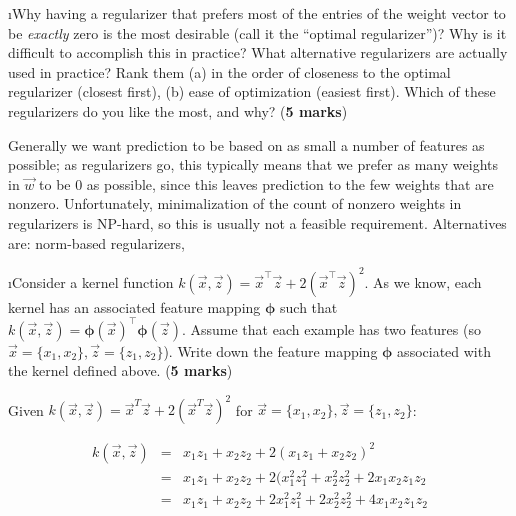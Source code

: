 \documentclass[fleqn]{article}
\begin{document}
\i Why having a regularizer that prefers most of the entries of the weight
vector to be \textit{exactly} zero is the most desirable (call it the ``optimal
regularizer'')? Why is it difficult to accomplish this in practice? What 
alternative regularizers are actually used in practice? Rank them (a) in the order
of closeness to the optimal regularizer (closest first), (b) ease of optimization
(easiest first). Which of these regularizers do you like the most, and why?
(\textbf{5 marks})

\begin{solution}
Generally we want prediction to be based on as small a number of features as possible; as regularizers go, this typically means that we prefer as many weights in $\vec{w}$ to be $0$ as possible, since this leaves prediction to the few weights that are nonzero. Unfortunately, minimalization of the count of nonzero weights in regularizers is NP-hard, so this is usually not a feasible requirement. Alternatives are: norm-based regularizers,
\end{solution}

\i Consider a kernel function $k(\vec{x},\vec{z}) = \vec{x}^\top \vec{z}
+ 2(\vec{x}^\top \vec{z})^2$. As we know, each kernel has an associated 
feature mapping $\boldsymbol{\phi}$ such that $k(\vec{x},\vec{z}) 
= \boldsymbol{\phi}(\vec{x})^\top \boldsymbol{\phi}(\vec{z})$. Assume that
each example has two features (so $\vec{x} = \{x_1,x_2\}, \vec{z} = \{z_1,z_2\}$). 
Write down the feature mapping $\boldsymbol{\phi}$ associated with 
the kernel defined above. (\textbf{5 marks})

\begin{solution}

Given $k(\vec{x}, \vec{z}) = \vec{x}^T\vec{z} + 2(\vec{x}^T\vec{z})^2$ for $\vec{x} = \{x_1, x_2\}, \vec{z} = \{z_1, z_2\}$:

\begin{eqnarray}
k(\vec{x}, \vec{z}) & = & x_1 z_1 + x_2 z_2 + 2(x_1 z_1 + x_2 z_2)^2 \\
& = & x_1 z_1 + x_2 z_2 + 2(x_1^2 z_1^2 + x_2^2 z_2^2 + 2x_1 x_2 z_1 z_2 \\
& = & x_1 z_1 + x_2 z_2 + 2x_1^2 z_1^2 + 2x_2^2 z_2^2 + 4 x_1 x_2 z_1 z_2
\end{eqnarray}
\end{solution}
\end{document}

